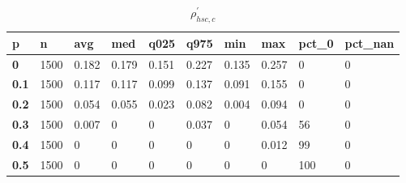 \begin{table}[h]
 \centering 
\footnotesize
\caption{$\rho_{hsc,c}^\prime $}
\label{tab:alphahscc}
\begin{tabular}[h]{|l|l|l|l|l|l|l|l|l|l|
    } \hline
\textbf{ p} & \textbf{ n} & \textbf{ avg} & \textbf{ med} & \textbf{ q025} & \textbf{ q975} & \textbf{ min} & \textbf{ max} & \textbf{ pct\_0} & \textbf{ pct\_nan}
    \\ \hline
  \textbf{  0} & 1500 & 0.182 & 0.179 & 0.151 & 0.227 & 0.135 & 0.257 &   0 & 0
    \\ \hline
  \textbf{0.1} & 1500 & 0.117 & 0.117 & 0.099 & 0.137 & 0.091 & 0.155 &   0 & 0
    \\ \hline
  \textbf{0.2} & 1500 & 0.054 & 0.055 & 0.023 & 0.082 & 0.004 & 0.094 &   0 & 0
    \\ \hline
  \textbf{0.3} & 1500 & 0.007 &     0 &     0 & 0.037 &     0 & 0.054 &  56 & 0
    \\ \hline
  \textbf{0.4} & 1500 &     0 &     0 &     0 &     0 &     0 & 0.012 &  99 & 0
    \\ \hline
  \textbf{0.5} & 1500 &     0 &     0 &     0 &     0 &     0 &     0 & 100 & 0
    \\ \hline
 \end{tabular}
 \end{table}

